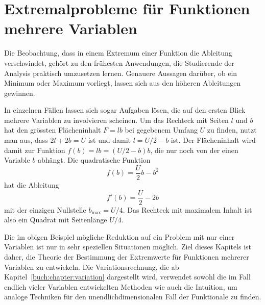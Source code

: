 %
%
%
\chapter{Extremalprobleme für Funktionen mehrere Variablen
\label{buch:chapter:fuvar}}
Die Beobachtung, dass in einem Extremum einer Funktion die Ableitung
verschwindet, gehört zu den frühesten Anwendungen, die Studierende
der Analysis praktisch umzusetzen lernen.
Genauere Aussagen darüber, ob ein Minimum oder Maximum 
vorliegt, lassen sich aus den höheren Ableitungen gewinnen.

In einzelnen Fällen lassen sich sogar Aufgaben lösen, die auf
den ersten Blick mehrere Variablen zu involvieren scheinen.
Um das Rechteck mit Seiten $l$ und $b$ hat den grössten Flächeninhalt
$F=lb$ bei gegebenem Umfang $U$ zu finden, nutzt man aus, dass $2l+2b=U$ ist
und damit $l=U/2-b$ ist.
Der Flächeninhalt wird damit zur Funktion $f(b)=lb=(U/2-b)b$, die nur
noch von der einen Variable $b$ abhängt. 
Die quadratische Funktion
\[
f(b) = \frac{U}2b-b^2
\]
hat die Ableitung
\[
f'(b) = \frac{U}2-2b
\]
mit der einzigen Nullstelle $b_{\text{max}}=U/4$.
Das Rechteck mit maximalem Inhalt ist also ein Quadrat mit Seitenlänge
$U/4$.

Die im obigen Beispiel mögliche Reduktion auf ein Problem mit nur einer
Variablen ist nur in sehr speziellen Situationen möglich.
Ziel dieses Kapitels ist daher, die Theorie der Bestimmung der
Extremwerte für Funktionen mehrerer Variablen zu entwickeln.
Die Variationsrechnung, die ab Kapitel~\ref{buch:chapter:variation}
dargestellt wird, verwendet sowohl die im Fall endlich vieler Variablen
entwickelten Methoden wie auch die Intuition, um analoge Techniken
für den unendlichdimensionalen Fall der Funktionale zu finden.






%

